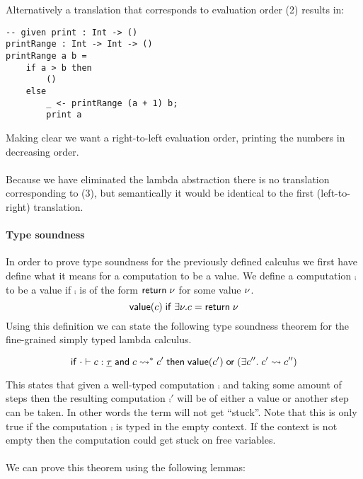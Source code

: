 {\\\\
Alternatively a translation that corresponds to evaluation order (2) results in:
\begin{verbatim}
-- given print : Int -> ()
printRange : Int -> Int -> ()
printRange a b =
	if a > b then
		()
	else
		_ <- printRange (a + 1) b;
		print a
\end{verbatim}
Making clear we want a right-to-left evaluation order, printing the numbers in decreasing order.
\\\\
Because we have eliminated the lambda abstraction there is no translation corresponding to (3), but semantically it would be identical to the first (left-to-right) translation.

\fi

\paragraph{Type soundness}
In order to prove type soundness for the previously defined calculus we first have define what it means for a computation to be a value.
We define a computation $\comp$ to be a value if $\comp$ is of the form $\mathsf{return} \; \nu$ for some value $\nu$.
	\[ \mathsf{value}(c) \;\mathsf{if}\; \exists \nu. c = \mathsf{return} \; \nu \]
Using this definition we can state the following type soundness theorem for the fine-grained simply typed lambda calculus.

\begin{theorem}
\[
	\mathsf{if}\;
		\cdot \vdash c : \underline{\tau}
		\;\mathsf{and}\;
		c \rightsquigarrow^* c'
	\;\mathsf{then}\;
		\mathsf{value}(c')
		\;\mathsf{or}\;
		(\exists c''.\; c' \rightsquigarrow c'')
\]
\end{theorem}

This states that given a well-typed computation $\comp$ and taking some amount of steps then the resulting computation $\comp'$ will be of either a value or another step can be taken.
In other words the term will not get ``stuck''.
Note that this is only true if the computation $\comp$ is typed in the empty context.
If the context is not empty then the computation could get stuck on free variables.
\\\\
We can prove this theorem using the following lemmas:

}

